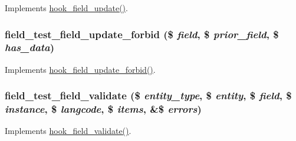 \label{field__test_8field_8inc_a199206c85728b6a0bf45265ceb8a0a9c}
Implements \hyperlink{group__field__types_gaca5bc4f8ab69818f23783af24454d9c4}{hook\_\-field\_\-update()}. \hypertarget{field__test_8field_8inc_a56f021d7534dd5e137a9df0b3ab6f968}{
\subsubsection[{field\_\-test\_\-field\_\-update\_\-forbid}]{\setlength{\rightskip}{0pt plus 5cm}field\_\-test\_\-field\_\-update\_\-forbid (\$ {\em field}, \/  \$ {\em prior\_\-field}, \/  \$ {\em has\_\-data})}}
\label{field__test_8field_8inc_a56f021d7534dd5e137a9df0b3ab6f968}
Implements \hyperlink{group__field__crud_ga7bd0ccd40a9a3690b697b68d03f660a4}{hook\_\-field\_\-update\_\-forbid()}. \hypertarget{field__test_8field_8inc_a20048bb4491985bdb9c7d491adf2c006}{
\subsubsection[{field\_\-test\_\-field\_\-validate}]{\setlength{\rightskip}{0pt plus 5cm}field\_\-test\_\-field\_\-validate (\$ {\em entity\_\-type}, \/  \$ {\em entity}, \/  \$ {\em field}, \/  \$ {\em instance}, \/  \$ {\em langcode}, \/  \$ {\em items}, \/  \&\$ {\em errors})}}
\label{field__test_8field_8inc_a20048bb4491985bdb9c7d491adf2c006}
Implements \hyperlink{group__field__types_gaa7d8846e8fe3766e1b3435cd50b965be}{hook\_\-field\_\-validate()}.

